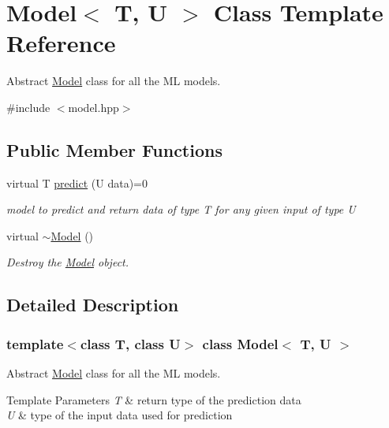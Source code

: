 \hypertarget{classModel}{}\section{Model$<$ T, U $>$ Class Template Reference}
\label{classModel}


Abstract \hyperlink{classModel}{Model} class for all the ML models.  




{\ttfamily \#include $<$model.\+hpp$>$}

\subsection*{Public Member Functions}
\begin{DoxyCompactItemize}
\item 
virtual T \hyperlink{classModel_aab70aeca992eb3a1ce09667e169b8743}{predict} (U data)=0
\begin{DoxyCompactList}\small\item\em model to predict and return data of type T for any given input of type U \end{DoxyCompactList}\item 
\mbox{\label{classModel_aa0a39659d8fc19ec48f2d83683567e05}} 
virtual \hyperlink{classModel_aa0a39659d8fc19ec48f2d83683567e05}{$\sim$\+Model} ()
\begin{DoxyCompactList}\small\item\em Destroy the \hyperlink{classModel}{Model} object. \end{DoxyCompactList}\end{DoxyCompactItemize}


\subsection{Detailed Description}
\subsubsection*{template$<$class T, class U$>$\newline
class Model$<$ T, U $>$}

Abstract \hyperlink{classModel}{Model} class for all the ML models. 


\begin{DoxyTemplParams}{Template Parameters}
{\em T} & return type of the prediction data \\
\hline
{\em U} & type of the input data used for prediction \\
\hline
\end{DoxyTemplParams}


